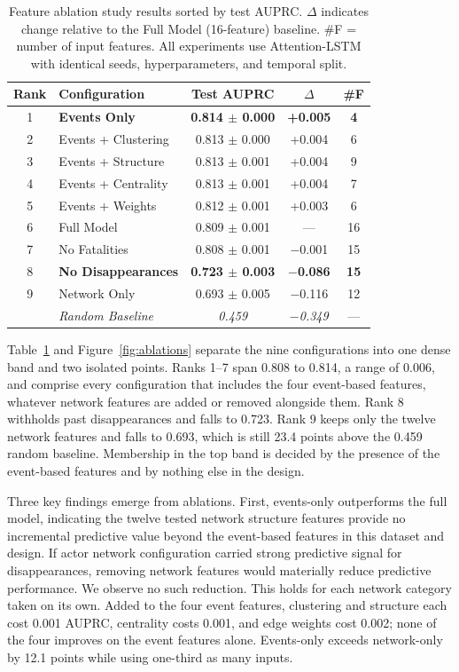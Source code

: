 \documentclass[pdflatex,sn-mathphys-num]{sn-jnl}%
\theoremstyle{thmstyleone}%
\theoremstyle{thmstyletwo}%
\theoremstyle{thmstylethree}%
\begin{document}
\begin{table}[h]
\centering
\caption{Feature ablation study results sorted by test AUPRC. $\Delta$ indicates change relative to the Full Model (16-feature) baseline. \#F = number of input features. All experiments use Attention-LSTM with identical seeds, hyperparameters, and temporal split.}
\label{tab:ablation_results}
\small
\begin{tabular}{clccc}
\toprule
\textbf{Rank} & \textbf{Configuration} & \textbf{Test AUPRC} & \textbf{$\Delta$} & \textbf{\#F} \\
\midrule
1 & \textbf{Events Only} & \textbf{0.814 $\pm$ 0.000} & \textbf{+0.005} & \textbf{4} \\
2 & Events + Clustering & 0.813 $\pm$ 0.000 & +0.004 & 6 \\
3 & Events + Structure & 0.813 $\pm$ 0.001 & +0.004 & 9 \\
4 & Events + Centrality & 0.813 $\pm$ 0.001 & +0.004 & 7 \\
5 & Events + Weights & 0.812 $\pm$ 0.001 & +0.003 & 6 \\
6 & Full Model & 0.809 $\pm$ 0.001 & --- & 16 \\
7 & No Fatalities & 0.808 $\pm$ 0.001 & $-$0.001 & 15 \\
8 & \textbf{No Disappearances} & \textbf{0.723 $\pm$ 0.003} & \textbf{$-$0.086} & \textbf{15} \\
9 & Network Only & 0.693 $\pm$ 0.005 & $-$0.116 & 12 \\
\midrule
& \textit{Random Baseline} & \textit{0.459} & \textit{$-$0.349} & --- \\
\bottomrule
\end{tabular}
\end{table}

Table~\ref{tab:ablation_results} and Figure~\ref{fig:ablations} separate the nine configurations into one dense band and two isolated points. Ranks 1--7 span 0.808 to 0.814, a range of 0.006, and comprise every configuration that includes the four event-based features, whatever network features are added or removed alongside them. Rank 8 withholds past disappearances and falls to 0.723. Rank 9 keeps only the twelve network features and falls to 0.693, which is still 23.4 points above the 0.459 random baseline. Membership in the top band is decided by the presence of the event-based features and by nothing else in the design.

Three key findings emerge from ablations. First, events-only outperforms the full model, indicating the twelve tested network structure features provide no incremental predictive value beyond the event-based features in this dataset and design. If actor network configuration carried strong predictive signal for disappearances, removing network features would materially reduce predictive performance. We observe no such reduction. This holds for each network category taken on its own. Added to the four event features, clustering and structure each cost 0.001 AUPRC, centrality costs 0.001, and edge weights cost 0.002; none of the four improves on the event features alone. Events-only exceeds network-only by 12.1 points while using one-third as many inputs.
\end{document}
